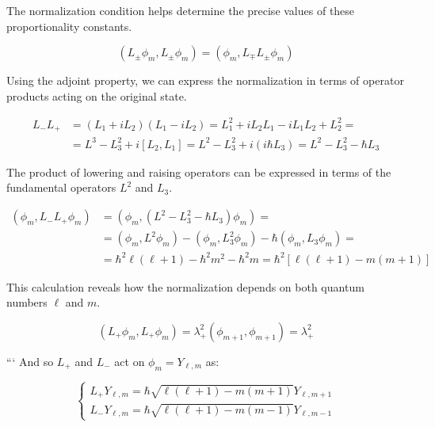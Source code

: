 \documentclass[10pt]{article}
\begin{document}
The normalization condition helps determine the precise values of these proportionality constants.

\begin{equation*}
\left(L_{ \pm} \phi_{m}, L_{ \pm} \phi_{m}\right)=\left(\phi_{m}, L_{\mp} L_{ \pm} \phi_{m}\right) \tag{8.18}
\end{equation*}

Using the adjoint property, we can express the normalization in terms of operator products acting on the original state.

\begin{align*}
L_{-} L_{+} & =\left(L_{1}+i L_{2}\right)\left(L_{1}-i L_{2}\right)=L_{1}^{2}+i L_{2} L_{1}-i L_{1} L_{2}+L_{2}^{2}= \\
& =L^{3}-L_{3}^{2}+i\left[L_{2}, L_{1}\right]=L^{2}-L_{3}^{2}+i\left(i \hbar L_{3}\right)=L^{2}-L_{3}^{2}-\hbar L_{3} \tag{8.19}
\end{align*}

The product of lowering and raising operators can be expressed in terms of the fundamental operators $L^2$ and $L_3$.

\begin{align*}
\left(\phi_{m}, L_{-} L_{+} \phi_{m}\right) & =\left(\phi_{m},\left(L^{2}-L_{3}^{2}-\hbar L_{3}\right) \phi_{m}\right)= \\
& =\left(\phi_{m}, L^{2} \phi_{m}\right)-\left(\phi_{m}, L_{3}^{2} \phi_{m}\right)-\hbar\left(\phi_{m}, L_{3} \phi_{m}\right)=  \tag{8.20}\\
& =\hbar^{2} \ell(\ell+1)-\hbar^{2} m^{2}-\hbar^{2} m=\hbar^{2}[\ell(\ell+1)-m(m+1)]
\end{align*}

This calculation reveals how the normalization depends on both quantum numbers $\ell$ and $m$.

\begin{equation*}
\left(L_{+} \phi_{m}, L_{+} \phi_{m}\right)=\lambda_{+}^{2}\left(\phi_{m+1}, \phi_{m+1}\right)=\lambda_{+}^{2} \tag{8.21}
\end{equation*}

```
And so $L_{+}$ and $L_{-}$ act on $\phi_{m}=Y_{\ell, m}$ as:

\[
\left\{\begin{array}{l}
L_{+} Y_{\ell, m}=\hbar \sqrt{\ell(\ell+1)-m(m+1)} Y_{\ell, m+1}  \tag{8.22}\\
L_{-} Y_{\ell, m}=\hbar \sqrt{\ell(\ell+1)-m(m-1)} Y_{\ell, m-1}
\end{array}\right.
\]
\end{document}
